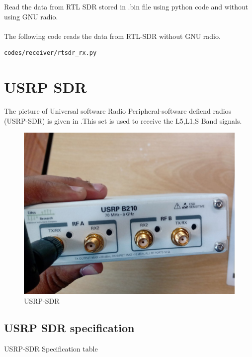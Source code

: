  Read the data from RTL SDR stored in .bin file using python code and without using GNU radio.
\\
\solution \\
The following code reads the data from RTL-SDR without GNU radio.
\begin{lstlisting}
codes/receiver/rtsdr_rx.py
\end{lstlisting}














\section{USRP SDR}
The picture of Universal software Radio Peripheral-software defiend radios (USRP-SDR)  is given in .This set is used to receive the L5,L1,S Band  signals.
\begin{figure}[H]
\centering
\includegraphics[width=0.5\columnwidth]{figs/USRP.png}
\caption{USRP-SDR}
\label{fig:USRP-SDR}
\end{figure}

\subsection{ USRP SDR specification}
 \begin{table}[!ht]
  \centering
 
 \caption{USRP-SDR Specification table }
\end{table}

